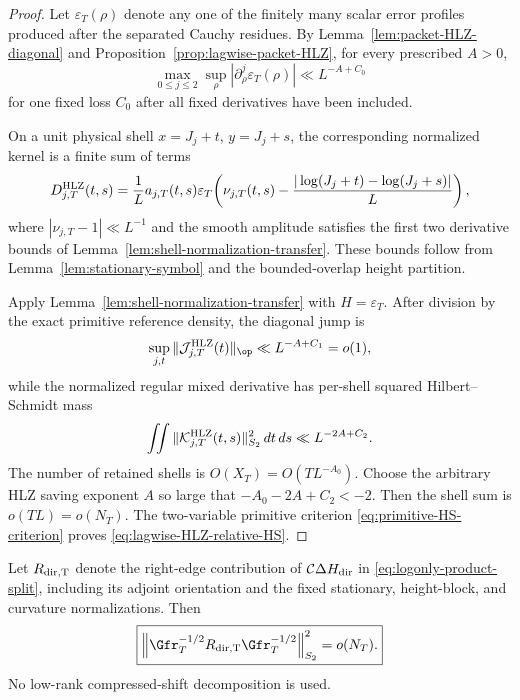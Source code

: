 \begin{proof}
Let $\varepsilon_T(\rho)$ denote any one of the finitely many scalar error
profiles produced after the separated Cauchy residues.  By
Lemma~\ref{lem:packet-HLZ-diagonal} and
Proposition~\ref{prop:lagwise-packet-HLZ}, for every prescribed $A>0$,
\begin{equation}
\max_{0\le j\le2}\sup_\rho
|\partial_\rho^j\varepsilon_T(\rho)|
\ll L^{-A+C_0}
\label{eq:lagwise-HLZ-profile-saving}
\end{equation}
for one fixed loss $C_0$ after all fixed derivatives have been included.

On a unit physical shell $x=J_j+t$, $y=J_j+s$, the corresponding normalized
kernel is a finite sum of terms
\begin{equation}
D_{j,T}^{\rm HLZ}(t,s)
=\frac1L a_{j,T}(t,s)
\varepsilon_T\!\left(
\nu_{j,T}(t,s)-
\frac{|\log(J_j+t)-\log(J_j+s)|}{L}
\right),
\label{eq:lagwise-HLZ-shell-kernel}
\end{equation}
where $|\nu_{j,T}-1|\ll L^{-1}$ and the smooth amplitude satisfies the first
two derivative bounds of Lemma~\ref{lem:shell-normalization-transfer}.  These
bounds follow from Lemma~\ref{lem:stationary-symbol} and the bounded-overlap
height partition.

Apply Lemma~\ref{lem:shell-normalization-transfer} with
$H=\varepsilon_T$.  After division by the exact primitive reference density,
the diagonal jump is
\[
\sup_{j,t}\|\mathcal J_{j,T}^{\rm HLZ}(t)\|_{\op}
\ll L^{-A+C_1}=o(1),
\]
while the normalized regular mixed derivative has per-shell squared
Hilbert--Schmidt mass
\[
\iint\|\mathcal K_{j,T}^{\rm HLZ}(t,s)\|_{S_2}^2\,dt\,ds
\ll L^{-2A+C_2}.
\]
The number of retained shells is $O(X_T)=O(TL^{-A_0})$.  Choose the arbitrary
HLZ saving exponent $A$ so large that
$-A_0-2A+C_2<-2$.  Then the shell sum is $o(TL)=o(N_T)$.  The two-variable
primitive criterion \eqref{eq:primitive-HS-criterion} proves
\eqref{eq:lagwise-HLZ-relative-HS}.
\end{proof}

\begin{lemma}
\label{lem:deltaH-dir-relative-regular}
Let $R_{\rm dir,T}$ denote the right-edge contribution of
$\mathcal C\Delta H_{\rm dir}$ in \eqref{eq:logonly-product-split}, including
its adjoint orientation and the fixed stationary, height-block, and curvature
normalizations.  Then
\begin{equation}
\boxed{
\left\|\Gfr_T^{-1/2}R_{\rm dir,T}\Gfr_T^{-1/2}\right\|_{S_2}^2
=o(N_T).
}
\label{eq:deltaH-dir-relative-HS}
\end{equation}
No low-rank compressed-shift decomposition is used.
\end{lemma}

